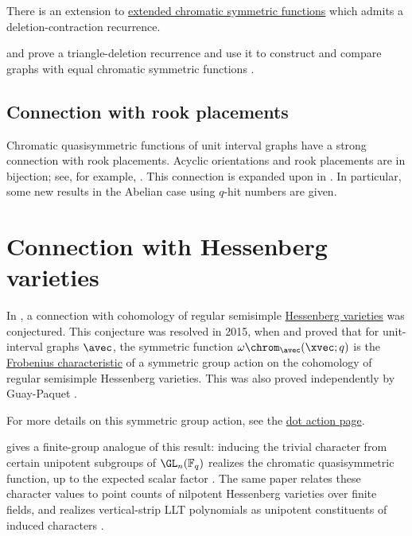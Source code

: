 There is an extension to \hyperref[extendedChromatic]{extended chromatic symmetric functions}
which admits a deletion-contraction recurrence.

 and  prove a triangle-deletion
recurrence and use it to construct and compare graphs with equal chromatic
symmetric functions \cite{OrellanaScott2014}.


\subsection[rookTheory]{Connection with rook placements}

Chromatic quasisymmetric functions of unit interval graphs have a strong connection with rook placements.
Acyclic orientations and rook placements are in bijection; see, for example,
\cite{AlexanderssonPanova2018}.
This connection is expanded upon in \cite{ColmenarejoMoralesPanova2023}.
In particular, some new results in the Abelian case using $q$-hit numbers are given.


\section[chromaticQuasisymmetricHessenberg]{Connection with Hessenberg varieties}

\label{chromaticQuasisymmetricMomentGraph}
In \cite[Conj.~5.3]{ShareshianWachs2012}, a connection with
cohomology of regular semisimple
\hyperref[hessenbergVarietiesBackground]{Hessenberg varieties} was conjectured.
This conjecture was resolved in 2015, when 
and  proved that for unit-interval graphs $\avec$,
the symmetric function $\omega \chrom_\avec(\xvec;q)$
is the \hyperref[frobeniusCharacteristic]{Frobenius characteristic} of
a symmetric group action on the cohomology of regular semisimple Hessenberg
varieties.
This was also proved independently by Guay-Paquet \cite{GuayPaquet2016x}.

For more details on this symmetric group action, see the \hyperref[dotAction]{dot action page}.

 gives a finite-group analogue of this result:
inducing the trivial character from certain unipotent subgroups of
$\GL_n(\mathbb{F}_q)$ realizes the chromatic quasisymmetric function, up to the
expected scalar factor \cite[Thm.~3.1]{Gagnon2024}.  The same paper relates
these character values to point counts of nilpotent Hessenberg varieties over
finite fields, and realizes vertical-strip LLT polynomials as unipotent
constituents of induced characters \cite[Thm.~5.1]{Gagnon2024}.


